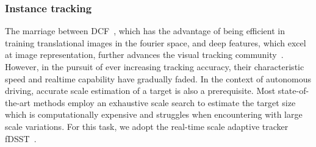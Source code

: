 \documentclass[10pt,twocolumn,letterpaper]{article}
\newcommand{\ra}[1]{\renewcommand{\arraystretch}{#1}}
\begin{document}
%

\subsubsection{Instance tracking}

The marriage between DCF~\cite{henriques2015high}, which has the advantage of being efficient in training translational images in the fourier space, and deep features, which excel at image representation, further advances the visual tracking community~\cite{qi2016hedged, danelljan2016eccv, wu2017kernalised, danelljan2017eco}. However, in the pursuit of ever increasing tracking accuracy, their characteristic speed and realtime capability have gradually faded. In the context of autonomous driving, accurate scale estimation of a target is also a prerequisite. Most state-of-the-art methods employ an exhaustive scale search to estimate the target size which is computationally expensive and struggles when encountering with large scale variations.
For this task, we adopt the real-time scale adaptive tracker fDSST~\cite{danelljan2017discriminative}.
\end{document}
